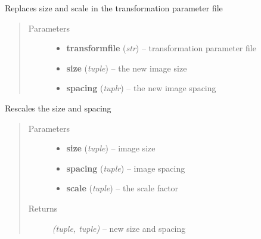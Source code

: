\documentclass[letterpaper,10pt,english]{sphinxmanual}
\begin{document}
\begin{fulllineitems}
\label{api/ClearMap.Alignment:ClearMap.Alignment.Elastix.setTransformFileSizeAndSpacing}
Replaces size and scale in the transformation parameter file
\begin{quote}\begin{description}
\item[{Parameters}] \leavevmode\begin{itemize}
\item {} 
\textbf{transformfile} (\emph{str}) --
transformation parameter file

\item {} 
\textbf{size} (\emph{tuple}) --
the new image size

\item {} 
\textbf{spacing} (\emph{tuplr}) --
the new image spacing

\end{itemize}

\end{description}\end{quote}

\end{fulllineitems}


\begin{fulllineitems}
\label{api/ClearMap.Alignment:ClearMap.Alignment.Elastix.rescaleSizeAndSpacing}
Rescales the size and spacing
\begin{quote}\begin{description}
\item[{Parameters}] \leavevmode\begin{itemize}
\item {} 
\textbf{size} (\emph{tuple}) --
image size

\item {} 
\textbf{spacing} (\emph{tuple}) --
image spacing

\item {} 
\textbf{scale} (\emph{tuple}) --
the scale factor

\end{itemize}

\item[{Returns}] \leavevmode
\emph{(tuple, tuple)} --
new size and spacing

\end{description}\end{quote}

\end{fulllineitems}
\end{document}
